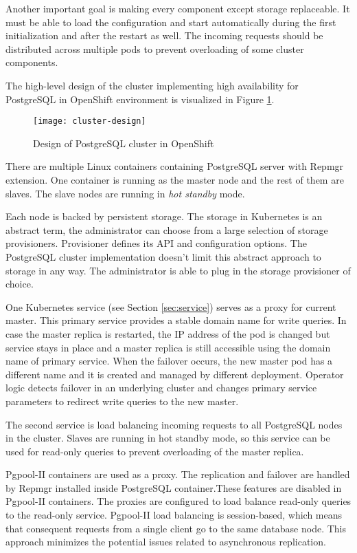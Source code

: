 \documentclass[
  digital, %
  twoside, %
  table,   %
  nolof,   %
  nolot,   %
]{fithesis3}
\begin{document}
Another important goal is making every component except storage replaceable. It must be able to load the configuration and start automatically during the first initialization and after the restart as well. The incoming requests should be distributed across multiple pods to prevent overloading of some cluster components.

The high-level design of the cluster implementing high availability for PostgreSQL in OpenShift environment is visualized in Figure \ref{fig:cluster_design}.

\begin{figure}[H]
\caption{Design of PostgreSQL cluster in OpenShift}
\centering
\texttt{[image: cluster-design]}
\label{fig:cluster_design}
\end{figure}

There are multiple Linux containers containing PostgreSQL server with Repmgr extension. One container is running as the master node and the rest of them are slaves. The slave nodes are running in \textit{hot standby} mode.

Each node is backed by persistent storage. The storage in Kubernetes is an abstract term, the administrator can choose from a large selection of storage provisioners. Provisioner defines its API and configuration options.  The PostgreSQL cluster implementation doesn't limit this abstract approach to storage in any way. The administrator is able to plug in the storage provisioner of choice.

One Kubernetes service (see Section \ref{sec:service}) serves as a proxy for current master. This primary service provides a stable domain name for write queries. In case the master replica is restarted, the IP address of the pod is changed but service stays in place and a master replica is still accessible using the domain name of primary service. When the failover occurs, the new master pod has a different name and it is created and managed by different deployment. Operator logic detects failover in an underlying cluster and changes primary service parameters to redirect write queries to the new master.

The second service is load balancing incoming requests to all  PostgreSQL nodes in the cluster. Slaves are running in hot standby mode, so this service can be used for read-only queries to prevent overloading of the master replica.

Pgpool-II containers are used as a proxy. The replication and failover are handled by Repmgr installed inside PostgreSQL container.These features are disabled in Pgpool-II containers. The proxies are configured to load balance read-only queries to the read-only service. Pgpool-II load balancing is session-based, which means that consequent requests from a single client go to the same database
node. This approach minimizes the potential issues related to asynchronous replication.
\end{document}
